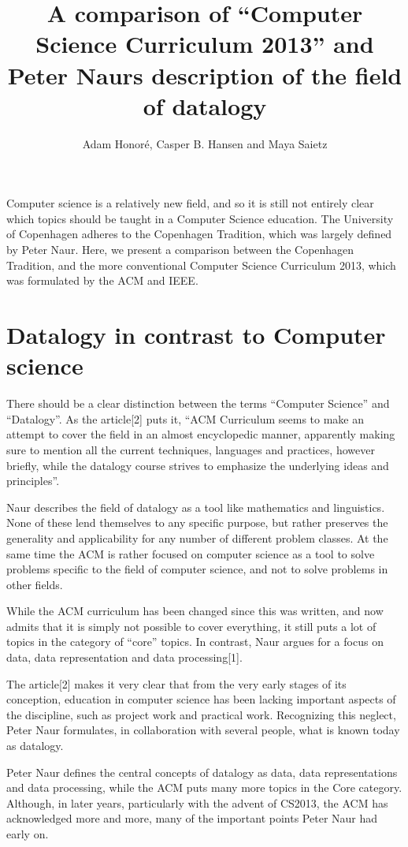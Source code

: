 \documentclass{article}
\title{A comparison of “Computer Science Curriculum 2013” and Peter Naurs description of the field of datalogy}
\author{Adam Honoré, Casper B. Hansen and Maya Saietz}
\begin{document}
\maketitle

\noindent Computer science is a relatively new field, and so it is still not entirely clear which topics should be taught in a
Computer Science education. The University of Copenhagen adheres to the Copenhagen Tradition, which was largely defined
by Peter Naur. Here, we present a comparison between the Copenhagen Tradition, and the more conventional Computer
Science Curriculum 2013, which was formulated by the ACM and IEEE.

\section{Datalogy in contrast to Computer science}
There should be a clear distinction between the terms “Computer Science” and “Datalogy”. As the article[2] puts it, “ACM
Curriculum seems to make an attempt to cover the field in an almost encyclopedic manner, apparently making sure to
mention all the current techniques, languages and practices, however briefly, while the datalogy course strives to
emphasize the underlying ideas and principles”.

Naur describes the field of datalogy as a tool like mathematics and linguistics. None of these lend themselves to any
specific purpose, but rather preserves the generality and applicability for any number of different problem classes. At
the same time the ACM is rather focused on computer science as a tool to solve problems specific to the field of
computer science, and not to solve problems in other fields.

While the ACM curriculum has been changed since this was written, and now admits that it is simply not possible to cover
everything, it still puts a lot of topics in the category of “core” topics. In contrast, Naur argues for a focus on
data, data representation and data processing[1].

The article[2] makes it very clear that from the very early stages of its conception, education in computer science has
been lacking important aspects of the discipline, such as project work and practical work. Recognizing this neglect,
Peter Naur formulates, in collaboration with several people, what is known today as datalogy.

Peter Naur defines the central concepts of datalogy as data, data representations and data processing, while the ACM
puts many more topics in the Core category. Although, in later years, particularly with the advent of CS2013, the ACM
has acknowledged more and more, many of the important points Peter Naur had early on.
\end{document}
